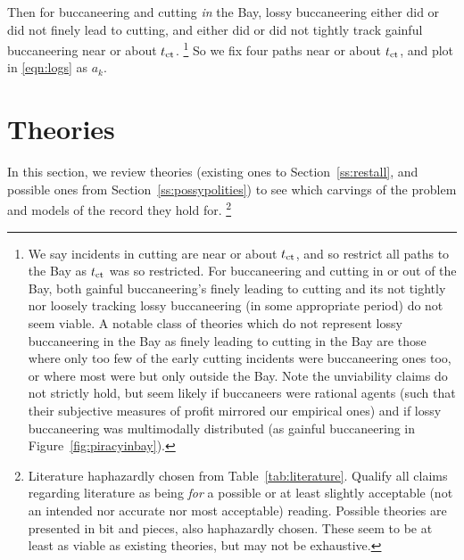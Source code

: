 		Then for buccaneering and cutting \emph{in} the Bay, lossy buccaneering either did or did not finely lead to cutting, and either did or did not tightly track gainful buccaneering near or about \(t_{\operatorname{ct}}\).%
		\footnote{We say  incidents in  cutting are near or about \(t_{\operatorname{ct}}\), and so restrict all paths to the Bay as \(t_{\operatorname{ct}}\) was so restricted. For buccaneering and cutting in or out of the Bay, both gainful buccaneering's finely leading to cutting and its not tightly nor loosely tracking lossy buccaneering (in some appropriate period) do not seem viable. A notable class of theories which do not represent lossy buccaneering in the Bay as finely leading to cutting in the Bay are those where only too few of the early cutting incidents were buccaneering ones too, or where most were but only outside the Bay. Note the unviability claims do not strictly hold, but seem likely if buccaneers were rational agents (such that their subjective measures of profit mirrored our empirical ones) and if lossy buccaneering was multimodally distributed (as gainful buccaneering in Figure~\ref{fig:piracyinbay}).} %
		So we fix four paths near or about \(t_{\operatorname{ct}}\), and plot in \ref{eqn:logs} as \(a_k\). %
%
%
%
%
\section{Theories} %
\label{s:theories}
	In this section, we review theories (existing ones to Section~\ref{ss:restall}, and possible ones from Section~\ref{ss:possypolities}) to see which carvings of the problem and models of the record they hold for.%
	\footnote{Literature haphazardly chosen from Table~\ref{tab:literature}. Qualify all claims regarding literature as being \emph{for} a possible or at least slightly acceptable (not an intended nor accurate nor most acceptable) reading. Possible theories are presented in bit and pieces, also haphazardly chosen. These seem to be at least as viable as existing theories, but may not be exhaustive.} %

